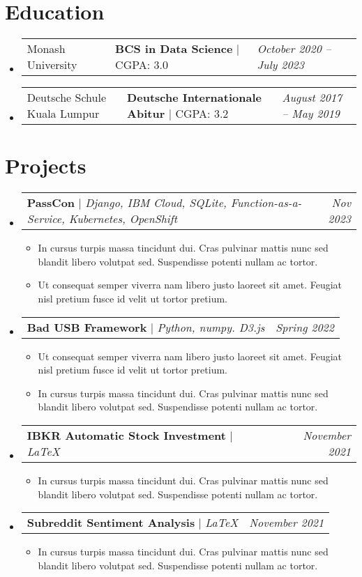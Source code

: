 \documentclass[letterpaper,10pt]{article}
\makeatletter
\newcommand{\subheadingtitlevspace}{
	\vspace{-3pt}
}
\newcommand{\resumeItem}[1]{
	\item{
		{#1 \vspace{-4pt}}
	}
}
\newcommand{\titleItem}[1]{
	\textbf{#1}
}
\newcommand{\resumeSubheading}[4]{
	\item
	\begin{tabular*}{0.97\textwidth}[t]{l@{\extracolsep{\fill}}l@{}l}     
		{#1} & \titleItem{#3} | {#2} & \textit{#4}\\
	\end{tabular*}\vspace{-10pt}
}
\newcommand{\resumeProjectHeading}[2]{
	\item
	\begin{tabular*}{0.97\textwidth}{l@{\extracolsep{\fill}}r}
		#1 & \textit{ #2} \\
	\end{tabular*}\vspace{-9pt}
}
\newcommand{\resumeSubHeadingListStart}{\subheadingtitlevspace\begin{itemize}[leftmargin=0.15in, label={}]}
\newcommand{\resumeSubHeadingListEnd}{\end{itemize}}
\newcommand{\resumeItemListStart}{
	\begin{itemize}}
\newcommand{\resumeItemListEnd}{
	\end{itemize}\vspace{-8pt}}
\makeatother
\begin{document}
	\section{Education}
	\resumeSubHeadingListStart
	\resumeSubheading
	{Monash University}{CGPA: 3.0}
	{BCS in Data Science}{October 2020 -- July 2023} 
	\resumeSubheading
	{Deutsche Schule Kuala Lumpur}{CGPA: 3.2}
	{Deutsche Internationale Abitur}{August 2017  -- May 2019}
	\resumeSubHeadingListEnd
	\vspace{-8pt}
	
	
	\section{Projects}    
	\resumeSubHeadingListStart
	\resumeProjectHeading
	{\titleItem{PassCon} $|$ \emph{Django, IBM Cloud, SQLite, Function-as-a-Service, Kubernetes, OpenShift}}{Nov 2023}
	\resumeItemListStart
	\resumeItem{In cursus turpis massa tincidunt dui. Cras pulvinar mattis nunc sed blandit libero volutpat sed. Suspendisse potenti nullam ac tortor. }
	\resumeItem{Ut consequat semper viverra nam libero justo laoreet sit amet. Feugiat nisl pretium fusce id velit ut tortor pretium.}
	\resumeItemListEnd
	\resumeProjectHeading
	{\titleItem{Bad USB Framework} $|$ \emph{Python, numpy. D3.js}}{Spring 2022}
	\resumeItemListStart
	\resumeItem{Ut consequat semper viverra nam libero justo laoreet sit amet. Feugiat nisl pretium fusce id velit ut tortor pretium.} 
	\resumeItem{In cursus turpis massa tincidunt dui. Cras pulvinar mattis nunc sed blandit libero volutpat sed. Suspendisse potenti nullam ac tortor. }
	\resumeItemListEnd
	\resumeProjectHeading
	{\titleItem{IBKR Automatic Stock Investment} $|$ \emph{\LaTeX}}{November 2021}
	\resumeItemListStart
	\resumeItem{In cursus turpis massa tincidunt dui. Cras pulvinar mattis nunc sed blandit libero volutpat sed. Suspendisse potenti nullam ac tortor. }
	\resumeItemListEnd
	\resumeProjectHeading
	{\titleItem{Subreddit Sentiment Analysis} $|$ \emph{\LaTeX}}{November 2021}
	\resumeItemListStart
	\resumeItem{In cursus turpis massa tincidunt dui. Cras pulvinar mattis nunc sed blandit libero volutpat sed. Suspendisse potenti nullam ac tortor. }
	\resumeItemListEnd
	\resumeSubHeadingListEnd
	
\end{document}
